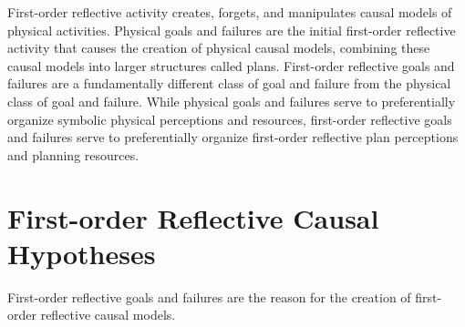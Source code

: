 First-order reflective activity creates, forgets, and manipulates
causal models of physical activities.  Physical goals and failures are
the initial first-order reflective activity that causes the creation
of physical causal models, combining these causal models into larger
structures called plans.  First-order reflective goals and failures
are a fundamentally different class of goal and failure from the
physical class of goal and failure.  While physical goals and failures
serve to preferentially organize symbolic physical perceptions and
resources, first-order reflective goals and failures serve to
preferentially organize first-order reflective plan perceptions and
planning resources.

\section{First-order Reflective Causal Hypotheses}

First-order reflective goals and failures are the reason for the
creation of first-order reflective causal models.



